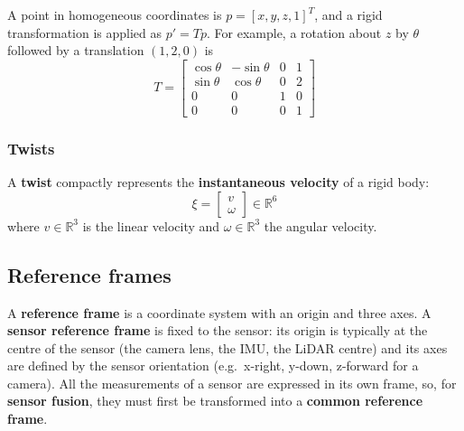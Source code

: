 \begin{examplebox}
A point in homogeneous coordinates is $p = [x, y, z, 1]^T$, and a rigid transformation is applied as $p' = Tp$.
For example, a rotation about $z$ by $\theta$ followed by a translation $(1, 2, 0)$ is
\[
T = \begin{bmatrix} \cos\theta & -\sin\theta & 0 & 1 \\ \sin\theta & \cos\theta & 0 & 2 \\ 0 & 0 & 1 & 0 \\ 0 & 0 & 0 & 1 \end{bmatrix}
\]
\end{examplebox}

\subsubsection{Twists}
A \textbf{twist} compactly represents the \textbf{instantaneous velocity} of a rigid body:
\[
\xi = \begin{bmatrix} v \\ \omega \end{bmatrix} \in \mathbb{R}^6
\]
where $v \in \mathbb{R}^3$ is the linear velocity and $\omega \in \mathbb{R}^3$ the angular velocity.

\subsection{Reference frames}
A \textbf{reference frame} is a coordinate system with an origin and three axes.
A \textbf{sensor reference frame} is fixed to the sensor: its origin is typically at the centre of the sensor (the camera lens, the IMU, the LiDAR centre) and its axes are defined by the sensor orientation (e.g.\ x-right, y-down, z-forward for a camera).
All the measurements of a sensor are expressed in its own frame, so, for \textbf{sensor fusion}, they must first be transformed into a \textbf{common reference frame}.

